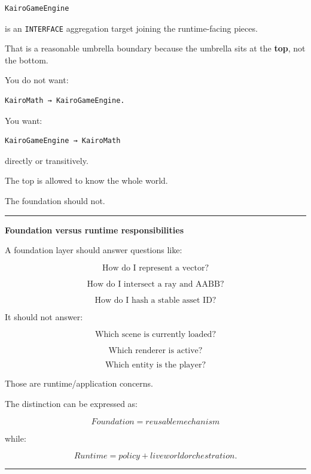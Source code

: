 \begin{verbatim}
KairoGameEngine
\end{verbatim}

is an \texttt{INTERFACE} aggregation target joining the runtime-facing pieces.

That is a reasonable umbrella boundary because the umbrella sits at the \textbf{top}, not the bottom.

You do not want:

\begin{verbatim}
KairoMath → KairoGameEngine.
\end{verbatim}

You want:

\begin{verbatim}
KairoGameEngine → KairoMath
\end{verbatim}

directly or transitively.

The top is allowed to know the whole world.

The foundation should not.

\begin{center}\rule{0.5\linewidth}{0.5pt}\end{center}

\textbf{Foundation versus runtime responsibilities}

A foundation layer should answer questions like:

\[
\text{How do I represent a vector?}
\]

\[
\text{How do I intersect a ray and AABB?}
\]

\[
\text{How do I hash a stable asset ID?}
\]

It should not answer:

\[
\text{Which scene is currently loaded?}
\]

\[
\text{Which renderer is active?}
\]

\[
\text{Which entity is the player?}
\]

Those are runtime/application concerns.

The distinction can be expressed as:

\[
\boxed{
Foundation = reusable mechanism
}
\]

while:

\[
\boxed{
Runtime = policy + live world orchestration.
}
\]

\begin{center}\rule{0.5\linewidth}{0.5pt}\end{center}

